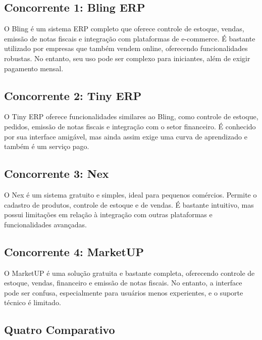 \documentclass[
	12pt,				%
	openright,			%
	twoside,			%
	a4paper,			%
	english,			%
	french,				%
	spanish,			%
	brazil				%
	]{abntex2}
\begin{document}
\subsection{Concorrente 1: Bling ERP}
O Bling é um sistema ERP completo que oferece controle de estoque, vendas, emissão de notas fiscais e integração com plataformas de e-commerce. É bastante utilizado por empresas que também vendem online, oferecendo funcionalidades robustas. No entanto, seu uso pode ser complexo para iniciantes, além de exigir pagamento mensal.

\subsection{Concorrente 2: Tiny ERP}
O Tiny ERP oferece funcionalidades similares ao Bling, como controle de estoque, pedidos, emissão de notas fiscais e integração com o setor financeiro. É conhecido por sua interface amigável, mas ainda assim exige uma curva de aprendizado e também é um serviço pago.

\subsection{Concorrente 3: Nex}
O Nex é um sistema gratuito e simples, ideal para pequenos comércios. Permite o cadastro de produtos, controle de estoque e de vendas. É bastante intuitivo, mas possui limitações em relação à integração com outras plataformas e funcionalidades avançadas.

\subsection{Concorrente 4: MarketUP}
O MarketUP é uma solução gratuita e bastante completa, oferecendo controle de estoque, vendas, financeiro e emissão de notas fiscais. No entanto, a interface pode ser confusa, especialmente para usuários menos experientes, e o suporte técnico é limitado.

\subsection{Quatro Comparativo}
\end{document}
